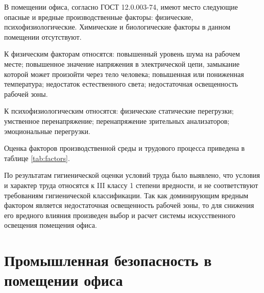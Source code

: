 
В помещении офиса, согласно ГОСТ 12.0.003-74, имеют место следующие опасные и вредные производственные факторы:
физические, психофизиологические. Химические и биологические факторы в данном помещении отсутствуют. 

К физическим факторам относятся: повышенный уровень шума на рабочем месте;
повышенное значение напряжения в электрической цепи, замыкание которой может
произойти через тело человека; повышенная или пониженная температура;
недостаток естественного света; недостаточная освещенность рабочей зоны. 

К психофизиологическим относятся: физические статические перегрузки; умственное перенапряжение; 
перенапряжение зрительных анализаторов; эмоциональные перегрузки.

Оценка факторов производственной среды и трудового процесса приведена в таблице \ref{tab:factors}.	

По результатам гигиенической оценки условий труда было выявлено, что условия и характер труда относятся
к III классу 1 степени вредности, и не соответствуют требованиям гигиенической классификации.
Так как доминирующим вредным фактором является недостаточная освещенность рабочей зоны, то для снижения
его вредного влияния произведен выбор и расчет системы искусственного освещения помещения офиса. 

\section{Промышленная безопасность в помещении офиса}

